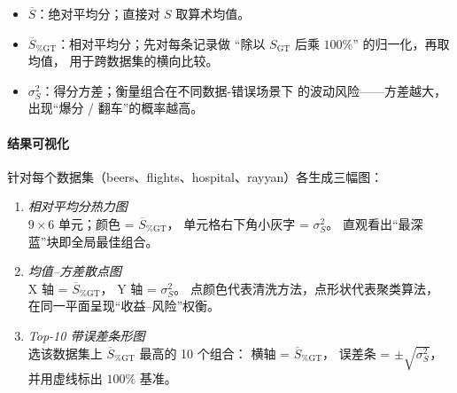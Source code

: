 \documentclass[10pt]{article} %
\numberwithin{equation}{section}
\begin{document}
\begin{itemize}[leftmargin=1.9em]
  \item \(\overline{S}\)：绝对平均分；直接对 \(S\) 取算术均值。
  \item \(\overline{S}_{\%\mathrm{GT}}\)：相对平均分；先对每条记录做
        “除以 \(S_{\mathrm{GT}}\) 后乘 \(100\%\)” 的归一化，再取均值，
        用于跨数据集的横向比较。
  \item \(\sigma^{2}_{S}\)：得分方差；衡量组合在不同数据-错误场景下
        的波动风险——方差越大，出现“爆分 / 翻车”的概率越高。
\end{itemize}

\vspace{0.3em}
\paragraph{结果可视化}
针对每个数据集（beers、flights、hospital、rayyan）各生成三幅图：

\begin{enumerate}[label=\arabic*) ,leftmargin=2.2em]
  \item \emph{相对平均分热力图}\\
        \(9\times6\) 单元；颜色 = \(\overline{S}_{\%\mathrm{GT}}\)，
        单元格右下角小灰字 = \(\sigma^{2}_{S}\)。
        直观看出“最深蓝”块即全局最佳组合。
  \item \emph{均值–方差散点图}\\
        X 轴 = \(\overline{S}_{\%\mathrm{GT}}\)，
        Y 轴 = \(\sigma^{2}_{S}\)。
        点颜色代表清洗方法，点形状代表聚类算法，
        在同一平面呈现“收益–风险”权衡。
  \item \emph{Top-10 带误差条形图}\\
        选该数据集上 \(\overline{S}_{\%\mathrm{GT}}\) 最高的 10 个组合：
        横轴 = \(\overline{S}_{\%\mathrm{GT}}\)，
        误差条 = \(\pm\sqrt{\sigma^{2}_{S}}\)，并用虚线标出 \(100\%\) 基准。
\end{enumerate}
\end{document}
